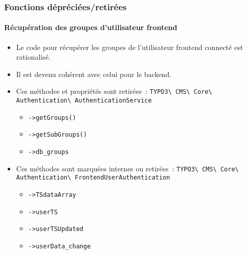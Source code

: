 %

\begin{frame}[fragile]
	\frametitle{Fonctions dépréciées/retirées}
	\framesubtitle{Récupération des groupes d'utilisateur frontend}

	\begin{itemize}
		\item Le code pour récupérer les groupes de l'utilisateur frontend connecté
			est rationalisé.
		\item Il est devenu cohérent avec celui pour le backend.
		\item Ces méthodes et propriétés sont retirées~:\newline
			\smaller\texttt{TYPO3\textbackslash
				CMS\textbackslash
				Core\textbackslash
				Authentication\textbackslash
				AuthenticationService}\normalsize

			\begin{itemize}\smaller
				\item \texttt{->getGroups()}
				\item \texttt{->getSubGroups()}
				\item \texttt{->db\_groups}
			\end{itemize}\normalsize

		\item Ces méthodes sont marquées internes ou retirées~:\newline
			\smaller\texttt{TYPO3\textbackslash
				CMS\textbackslash
				Core\textbackslash
				Authentication\textbackslash
				FrontendUserAuthentication}\normalsize

			\begin{itemize}\smaller
				\item \texttt{->TSdataArray}
				\item \texttt{->userTS}
				\item \texttt{->userTSUpdated}
				\item \texttt{->userData\_change}
			\end{itemize}\normalsize

	\end{itemize}

\end{frame}

